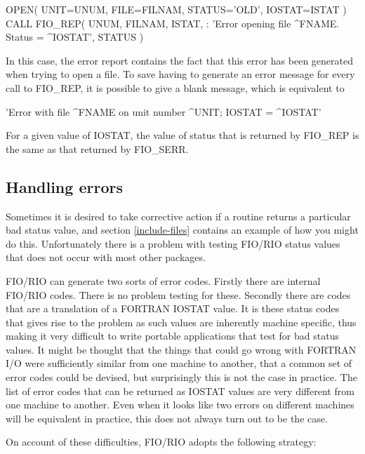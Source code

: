 \documentclass[twoside,11pt,nolof]{starlink}
\begin{document}
\begin{terminalv}
      OPEN( UNIT=UNUM, FILE=FILNAM, STATUS='OLD', IOSTAT=ISTAT )
      CALL FIO_REP( UNUM, FILNAM, ISTAT,
     :  'Error opening file ^FNAME. Status = ^IOSTAT', STATUS )
\end{terminalv}

In this case, the error report contains the fact that this error has been
generated when trying to open a file. To save having to generate an error
message for every call to FIO\_REP, it is possible to give a blank message,
which is equivalent to

\begin{terminalv}
'Error with file ^FNAME on unit number ^UNIT; IOSTAT = ^IOSTAT'
\end{terminalv}

For a given value of IOSTAT, the value of status that is returned by FIO\_REP
is the same as that returned by FIO\_SERR.

\subsection{Handling errors}

Sometimes it is desired to take corrective action if a routine returns a
particular bad status value, and section \ref{include-files} contains an
example of how you might do this. Unfortunately there is a problem with testing
FIO/RIO status values that does not occur with most other packages.

FIO/RIO can generate two sorts of error codes. Firstly there are internal
FIO/RIO codes. There is no problem testing for these. Secondly there are codes
that are a translation of a FORTRAN IOSTAT value. It is these status codes that
gives rise to the problem as such values are inherently machine specific, thus
making it very difficult to write portable applications that test for bad
status values. It might be thought that the things that could go wrong with
FORTRAN I/O were sufficiently similar from one machine to another, that a
common set of error codes could be devised, but surprisingly this is not the
case in practice. The list of error codes that can be returned as IOSTAT values
are very different from one machine to another. Even when it looks like two
errors on different machines will be equivalent in practice, this does not
always turn out to be the case.

On account of these difficulties, FIO/RIO adopts the following strategy:
\end{document}
